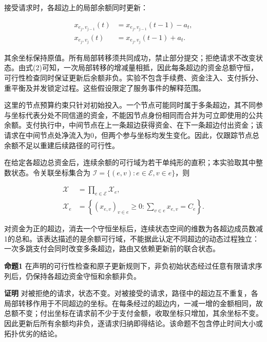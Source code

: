 \documentclass[UTF8,a4paper,twocolumn,fontset=none,zihao=5]{ctexart}
\begin{document}
接受请求时，各超边上的局部余额同时更新：



\begin{equation}
\begin{aligned}x_{e_j,v_{j-1}}(t)&=x_{e_j,v_{j-1}}(t-1)-a_t,\\x_{e_j,v_j}(t)&=x_{e_j,v_j}(t-1)+a_t.\end{aligned}
\label{eq:2}\end{equation}


其余坐标保持原值。所有局部转移须共同成功，禁止部分提交；拒绝请求不改变状态。由式(2)可知，一次局部转移的增减量相抵，因此每条超边的资金总额守恒，可行性检查同时保证更新后余额非负。实验不包含手续费、资金注入、支付拆分、重平衡及并发锁定过程。这些假设限定了服务事件的解释范围。


这里的节点预算约束只针对初始投入。一个节点可能同时属于多条超边，其不同参与坐标代表分处不同信道的资金，不能因节点身份相同而合并为可立即使用的公共余额。支付执行中，中间节点在上一条超边获得资金、在下一条超边付出资金；该请求在中间节点处净流入为0，但两个参与坐标均发生变化。因此，仅跟踪节点总余额不足以重建后续路径的可行性。


在给定各超边总资金后，连续余额的可行域为若干单纯形的直积；本实验取其中整数状态。令关联坐标集合为 $\mathcal I=\{(e,v):e\in\mathcal E,v\in e\}$，则



\begin{equation}
\begin{aligned}\mathcal X&=\prod_{e\in\mathcal E}\mathcal X_e,\\\mathcal X_e&=\left\{(x_{e,v})_{v\in e}\geq0:\sum_{v\in e}x_{e,v}=C_e\right\}.\end{aligned}
\label{eq:3}\end{equation}


对资金为正的超边，消去一个守恒坐标后，连续状态空间的维数为各超边成员数减1的总和。该表达描述的是余额可行域，不能据此认定不同超边的动态过程独立：一次多跳支付会同时改变多条超边，路由又依赖更新前的联合状态。


\noindent\textbf{命题1} 在声明的可行性检查和原子更新规则下，非负初始状态经过任意有限请求序列后，仍保持各超边资金守恒和余额非负。\par

\noindent\textbf{证明} 对被拒绝的请求，状态不变。对被接受的请求，路径中的超边互不重复，各局部转移作用于不同超边的坐标。在每条经过的超边内，一减一增的金额相同，故总额不变；付出坐标在请求前不少于支付金额，收取坐标只增加，其余坐标不变。因此更新后所有余额均非负，逐请求归纳即得结论。该命题不包含停止时间大小或拓扑优劣的结论。\par
\end{document}
